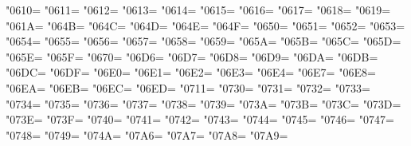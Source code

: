 \XeTeXcharclass"0610=\KclassCM
\XeTeXcharclass"0611=\KclassCM
\XeTeXcharclass"0612=\KclassCM
\XeTeXcharclass"0613=\KclassCM
\XeTeXcharclass"0614=\KclassCM
\XeTeXcharclass"0615=\KclassCM
\XeTeXcharclass"0616=\KclassCM
\XeTeXcharclass"0617=\KclassCM
\XeTeXcharclass"0618=\KclassCM
\XeTeXcharclass"0619=\KclassCM
\XeTeXcharclass"061A=\KclassCM
\XeTeXcharclass"064B=\KclassCM
\XeTeXcharclass"064C=\KclassCM
\XeTeXcharclass"064D=\KclassCM
\XeTeXcharclass"064E=\KclassCM
\XeTeXcharclass"064F=\KclassCM
\XeTeXcharclass"0650=\KclassCM
\XeTeXcharclass"0651=\KclassCM
\XeTeXcharclass"0652=\KclassCM
\XeTeXcharclass"0653=\KclassCM
\XeTeXcharclass"0654=\KclassCM
\XeTeXcharclass"0655=\KclassCM
\XeTeXcharclass"0656=\KclassCM
\XeTeXcharclass"0657=\KclassCM
\XeTeXcharclass"0658=\KclassCM
\XeTeXcharclass"0659=\KclassCM
\XeTeXcharclass"065A=\KclassCM
\XeTeXcharclass"065B=\KclassCM
\XeTeXcharclass"065C=\KclassCM
\XeTeXcharclass"065D=\KclassCM
\XeTeXcharclass"065E=\KclassCM
\XeTeXcharclass"065F=\KclassCM
\XeTeXcharclass"0670=\KclassCM
\XeTeXcharclass"06D6=\KclassCM
\XeTeXcharclass"06D7=\KclassCM
\XeTeXcharclass"06D8=\KclassCM
\XeTeXcharclass"06D9=\KclassCM
\XeTeXcharclass"06DA=\KclassCM
\XeTeXcharclass"06DB=\KclassCM
\XeTeXcharclass"06DC=\KclassCM
\XeTeXcharclass"06DF=\KclassCM
\XeTeXcharclass"06E0=\KclassCM
\XeTeXcharclass"06E1=\KclassCM
\XeTeXcharclass"06E2=\KclassCM
\XeTeXcharclass"06E3=\KclassCM
\XeTeXcharclass"06E4=\KclassCM
\XeTeXcharclass"06E7=\KclassCM
\XeTeXcharclass"06E8=\KclassCM
\XeTeXcharclass"06EA=\KclassCM
\XeTeXcharclass"06EB=\KclassCM
\XeTeXcharclass"06EC=\KclassCM
\XeTeXcharclass"06ED=\KclassCM
\XeTeXcharclass"0711=\KclassCM
\XeTeXcharclass"0730=\KclassCM
\XeTeXcharclass"0731=\KclassCM
\XeTeXcharclass"0732=\KclassCM
\XeTeXcharclass"0733=\KclassCM
\XeTeXcharclass"0734=\KclassCM
\XeTeXcharclass"0735=\KclassCM
\XeTeXcharclass"0736=\KclassCM
\XeTeXcharclass"0737=\KclassCM
\XeTeXcharclass"0738=\KclassCM
\XeTeXcharclass"0739=\KclassCM
\XeTeXcharclass"073A=\KclassCM
\XeTeXcharclass"073B=\KclassCM
\XeTeXcharclass"073C=\KclassCM
\XeTeXcharclass"073D=\KclassCM
\XeTeXcharclass"073E=\KclassCM
\XeTeXcharclass"073F=\KclassCM
\XeTeXcharclass"0740=\KclassCM
\XeTeXcharclass"0741=\KclassCM
\XeTeXcharclass"0742=\KclassCM
\XeTeXcharclass"0743=\KclassCM
\XeTeXcharclass"0744=\KclassCM
\XeTeXcharclass"0745=\KclassCM
\XeTeXcharclass"0746=\KclassCM
\XeTeXcharclass"0747=\KclassCM
\XeTeXcharclass"0748=\KclassCM
\XeTeXcharclass"0749=\KclassCM
\XeTeXcharclass"074A=\KclassCM
\XeTeXcharclass"07A6=\KclassCM
\XeTeXcharclass"07A7=\KclassCM
\XeTeXcharclass"07A8=\KclassCM
\XeTeXcharclass"07A9=\KclassCM
